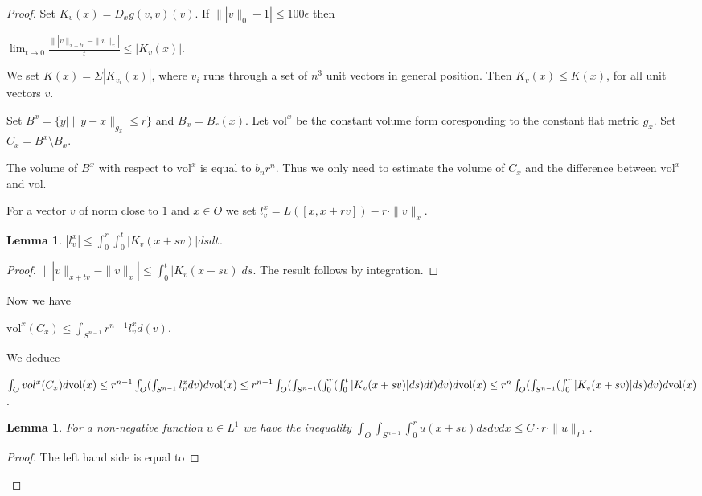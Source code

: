 \documentclass[12pt,leqno]{amsart}
\numberwithin{equation}{section}
\newtheorem{lem}[thm]{Lemma}
\theoremstyle{definition}
\theoremstyle{remark}
\newcommand{\vol}{\mathrm{vol}}
\begin{document}
 \begin{proof}
%
%
 Set $K_v (x) = D_x g(v,v) (v)$.  If $\||v\|_0 -1| \leq 100\epsilon$  then

 $\lim _{t\to 0} \frac {\||v\|_{x+tv} - \|v\| _x|} t \leq |K_v (x)|$.

 We set $K(x)= \Sigma |K_{v_i}(x)|$, where $v_i$ runs through a set of $n^3$ unit vectors in general position.
 Then $K_v(x) \leq K (x)$, for all unit vectors $v$.

 Set $B^x = \{ y | \|y-x\| _{g_x} \leq r \}$ and $B_x = B_r (x)$.  Let $\vol ^x$ be the constant
 volume form coresponding to the constant flat metric $g_x$.
   Set $C_x = B^x \setminus B_x$.

   The volume of $B^x$ with respect to $\vol ^x$ is equal to $b_n r^n$. Thus we only need to estimate
  the volume of $C_x$ and the difference between $\vol ^x$ and $\vol$.

 For a vector $v$ of norm close to $1$ and $x\in O$ we set
 $l_v ^x = L ([x,x+rv]) - r \cdot \| v\| _x$.

 \begin{lem}
 $|l_v ^x| \leq \int _0 ^r  \int _0 ^t | K_v (x+sv)| ds dt$.
 \end{lem}


 \begin{proof}
 $\||v\|_{x+tv} -\|v\| _x| \leq \int _0 ^t  |K_v (x+sv)| ds$. The result follows by integration.
  \end{proof}


   Now we have

   $\vol ^x (C_x) \leq \int _{S^{n-1}} r^{n-1} l^x _v d(v) $.


    We deduce

    $\int _O vol ^x (C_x) d\vol (x) \leq r^{n-1} \int _O (\int _{S^{n-1}} l_v ^x dv) d\vol (x) \leq \\
    r^{n-1} \int _O (\int _{S^{n-1}} (\int _0 ^r (\int _0 ^t |K_v (x+sv)| ds)dt)dv)d\vol (x) \leq \\
    r^n \int _O (\int _{S^{n-1}} (\int _0 ^r |K_v (x+sv)| ds) dv)d\vol (x)$.


    \begin{lem}
    For a non-negative function $u\in L^1$ we have the inequality
    $\int _O \int _{S^{n-1}} \int _0^r u(x+sv) ds dv dx \leq C \cdot r \cdot \|u\| _{L^1}$.
    \end{lem}


     \begin{proof}
     The left hand side is equal to


\end{proof}
\end{proof}
\end{document}
